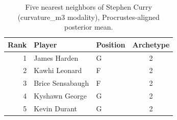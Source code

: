 \begin{table}[htbp]
  \centering\small
  \begin{tabular}{rllc}
    \toprule
    Rank & Player & Position & Archetype \\
    \midrule
    1 & James Harden & G & 2 \\
    2 & Kawhi Leonard & F & 2 \\
    3 & Brice Sensabaugh & F & 2 \\
    4 & Kyshawn George & G & 2 \\
    5 & Kevin Durant & G & 2 \\
    \bottomrule
  \end{tabular}
  \caption{Five nearest neighbors of Stephen Curry (curvature_m3 modality), Procrustes-aligned posterior mean.}
  \label{tab:Stephen_Curry_neighbors_curvature_m3}
\end{table}

